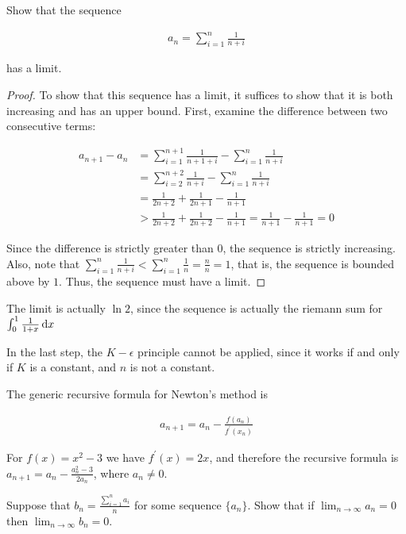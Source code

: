 Show that the sequence

\begin{align*}
  a_n = \sum_{i = 1}^{n} \frac{1}{n + i}
\end{align*}

has a limit.

\begin{proof}
  To show that this sequence has a limit, it suffices to show that it is both increasing and has an upper bound. First, examine the difference between two consecutive terms:

  \begin{align*}
    a_{n + 1} - a_n &= \sum_{i = 1}^{n + 1} \frac{1}{n + 1 + i} - \sum_{i = 1}^{n} \frac{1}{n + i} \\
    &= \sum_{i = 2}^{n + 2} \frac{1}{n + i} - \sum_{i = 1}^{n} \frac{1}{n + i} \\
    &= \frac{1}{2n + 2} + \frac{1}{2n + 1} - \frac{1}{n + 1} \\
    &> \frac{1}{2n + 2} + \frac{1}{2n + 2} - \frac{1}{n + 1} = \frac{1}{n + 1} - \frac{1}{n + 1} = 0
  \end{align*}

  Since the difference is strictly greater than $0$, the sequence is strictly increasing. Also, note that $\sum_{i = 1}^{n} \frac{1}{n + i} < \sum_{i = 1}^{n} \frac{1}{n} = \frac{n}{n} = 1$, that is, the sequence is bounded above by $1$. Thus, the sequence must have a limit.
\end{proof}

The limit is actually $\ln 2$, since the sequence is actually the riemann sum for $\int_0^1 \frac{1}{1 + x} \mathop{}\!\mathrm{d} x$

In the last step, the $K-\epsilon$ principle cannot be applied, since it works if and only if $K$ is a constant, and $n$ is not a constant.

The generic recursive formula for Newton's method is

\begin{align*}
  a_{n + 1} = a_n - \frac{f(a_n)}{f^{\prime}(x_n)}
\end{align*}

For $f(x) = x^2 - 3$ we have $f^{\prime}(x) = 2x$, and therefore the recursive formula is $a_{n + 1} = a_n - \frac{a_n^2 - 3}{2a_n}$, where $a_n \neq 0$.

Suppose that $b_n = \frac{\sum_{i = 1}^n a_i}{n}$ for some sequence $\{a_n\}$. Show that if $\lim_{n \rightarrow \infty} a_n = 0$ then $\lim_{n \rightarrow \infty} b_n = 0$.

